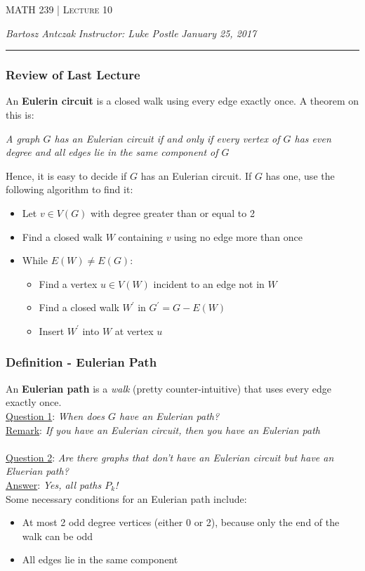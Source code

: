 \documentclass{report}
\newcommand{\lectureNum}{10}
\newcommand{\curDate}{January 25, 2017}
\newcommand{\course}{MATH 239}
\newcommand{\instructor}{Luke Postle}
\begin{document}
\begin{center}
\begin{Large}
\textsc{\course{} | Lecture \lectureNum{}}
\end{Large}
\end{center} 
\noindent \textit{Bartosz Antczak} \hfill
\textit{Instructor: \instructor{}} \hfill
\textit{\curDate{}}
\rule{\textwidth}{0.4pt}

\subsubsection{Review of Last Lecture}
An \textbf{Eulerin circuit} is a closed walk using every edge exactly once. A theorem on this is:
\begin{center}
\textit{A graph $G$ has an Eulerian circuit if and only if every vertex of $G$ has even degree and all edges lie in the same component of $G$}
\end{center}
Hence, it is easy to decide if $G$ has an Eulerian circuit. If $G$ has one, use the following algorithm to find it:
\begin{itemize}
\item Let $v \in V(G)$ with degree greater than or equal to 2
\item Find a closed walk $W$ containing $v$ using no edge more than once
\item While $E(W) \neq E(G)$:
\begin{itemize}
\item Find a vertex $u \in V(W)$ incident to an edge not in $W$
\item Find a closed walk $W^\prime$ in $G^\prime = G - E(W)$
\item Insert $W^\prime$ into $W$ at vertex $u$
\end{itemize}
\end{itemize}
\subsubsection{Definition - Eulerian Path}
An \textbf{Eulerian path} is a \textit{walk} (pretty counter-intuitive) that uses every edge exactly once.\\
\underline{Question 1}: \textit{When does $G$ have an Eulerian path?} \\
\underline{Remark}: \textit{If you have an Eulerian circuit, then you have an Eulerian path}\\\\
\underline{Question 2}: \textit{Are there graphs that don't have an Eulerian circuit but have an Eluerian path?} \\
\underline{Answer}: \textit{Yes, all paths $P_k$!}\\
Some necessary conditions for an Eulerian path include:
\begin{itemize}
\item At most 2 odd degree vertices (either 0 or 2), because only the end of the walk can be odd
\item All edges lie in the same component
\end{itemize}
\end{document}
